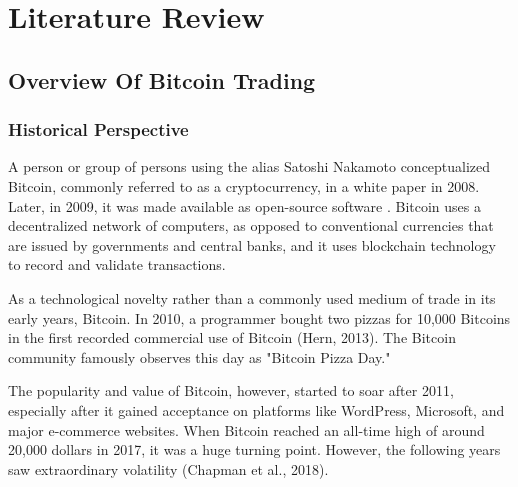 \def\baselinestretch{1}

\chapter{Literature Review}

\def\baselinestretch{1.44}


   
\smallskip

\goodbreak
\section{Overview Of Bitcoin Trading}
\smallskip

\goodbreak

\subsection{Historical Perspective}
A person or group of persons using the alias Satoshi Nakamoto conceptualized Bitcoin, commonly referred to as a cryptocurrency, in a white paper in 2008. Later, in 2009, it was made available as open-source software \citep{article}. Bitcoin uses a decentralized network of computers, as opposed to conventional currencies that are issued by governments and central banks, and it uses blockchain technology to record and validate transactions.

As a technological novelty rather than a commonly used medium of trade in its early years, Bitcoin. In 2010, a programmer bought two pizzas for 10,000 Bitcoins in the first recorded commercial use of Bitcoin (Hern, 2013). The Bitcoin community famously observes this day as "Bitcoin Pizza Day."


The popularity and value of Bitcoin, however, started to soar after 2011, especially after it gained acceptance on platforms like WordPress, Microsoft, and major e-commerce websites. When Bitcoin reached an all-time high of around 20,000 dollars in 2017, it was a huge turning point. However, the following years saw extraordinary volatility (Chapman et al., 2018).

